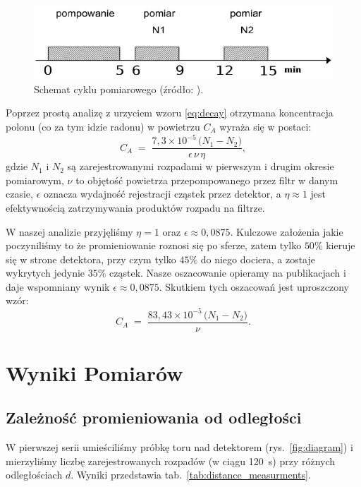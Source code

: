 \documentclass[12pt]{article}
\begin{document}
\begin{figure}[H]
	\centering
	\includegraphics[scale=0.7]{cycle}
	\caption{Schemat cyklu pomiarowego (źródło: \cite{skrypt}).}
	\label{fig:cycle}
\end{figure}

Poprzez prostą analizę z urzyciem wzoru \eqref{eq:decay} otrzymana koncentracja polonu (co za tym idzie radonu) w powietrzu \(C_A\) wyraża się w postaci:
\[
	C_A \;=\; \frac{7{,}3 \times 10^{-5}\,\bigl(N_1 - N_2\bigr)}{\epsilon\,\nu\,\eta},
\]
gdzie \(N_1\) i \(N_2\) są zarejestrowanymi rozpadami w pierwszym i drugim okresie pomiarowym, \(\nu\) to objętość powietrza przepompowanego przez filtr w danym czasie, \(\epsilon\) oznacza wydajność rejestracji cząstek przez detektor, a \(\eta\approx 1\) jest efektywnością zatrzymywania produktów rozpadu na filtrze.

W naszej analizie przyjęliśmy \(\eta=1\) oraz \(\epsilon \approx 0{,}0875\). Kulczowe założenia jakie poczyniliśmy to że promieniowanie roznosi się po sferze, zatem tylko \(50\%\) kieruje się w strone detektora, przy czym tylko \(45\%\) do niego dociera, a zostaje wykrytych jedynie $35\%$ cząstek.
Nasze oszacowanie opieramy na publikacjach \cite{scynt,alpha_range} i daje wspomniany wynik \(\epsilon \approx 0{,}0875\). Skutkiem tych oszacowań jest uproszczony wzór:
\begin{equation}
	C_A \;=\; \frac{83{,}43 \times 10^{-5}\,\bigl(N_1 - N_2\bigr)}{\nu}.
	\label{eq:markov}
\end{equation}

\section{Wyniki Pomiarów}

\subsection{Zależność promieniowania od odległości}
W pierwszej serii umieściliśmy próbkę toru nad detektorem (rys.~\ref{fig:diagram}) i mierzyliśmy liczbę zarejestrowanych rozpadów (w ciągu 120~s) przy różnych odległościach \(d\). Wyniki przedstawia tab.~\ref{tab:distance_measurments}.
\end{document}
